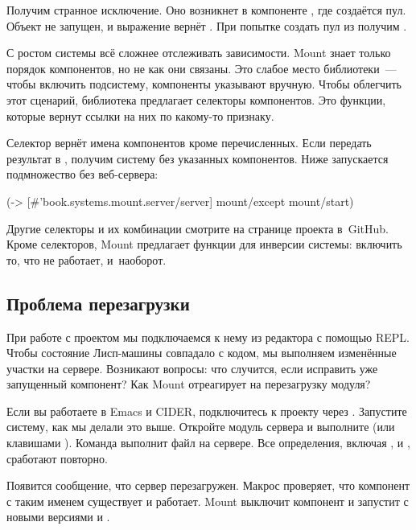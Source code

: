 Получим странное исключение. Оно возникнет в компоненте , где создаётся
пул. Объект  не запущен, и выражение  вернёт
. При попытке создать пул из  получим .

С ростом системы всё сложнее отслеживать зависимости. Mount знает только порядок
компонентов, но не как они связаны. Это слабое место библиотеки~--- чтобы
включить подсистему, компоненты указывают вручную. Чтобы облегчить этот
сценарий, библиотека предлагает селекторы компонентов. Это функции, которые
вернут ссылки на них по какому-то признаку.

Селектор  вернёт имена компонентов кроме перечисленных. Если
передать результат в , получим систему без указанных
компонентов. Ниже запускается подмножество без веб-сервера:

\begin{clojure}
(-> [#'book.systems.mount.server/server]
    mount/except
    mount/start)
\end{clojure}

Другие селекторы и их комбинации смотрите на странице проекта в~GitHub. Кроме
селекторов, Mount предлагает функции для инверсии системы: включить то, что не
работает, и~наоборот.

\subsection{Проблема перезагрузки}

При работе с проектом мы подключаемся к нему из редактора с помощью REPL. Чтобы
состояние Лисп-машины совпадало с кодом, мы выполняем изменённые участки на
сервере. Возникают вопросы: что случится, если исправить уже запущенный
компонент? Как Mount отреагирует на перезагрузку модуля?


Если вы работаете в Emacs и CIDER, подключитесь к проекту через
. Запустите систему, как мы делали это выше.
Откройте модуль сервера и выполните 
(или клавишами ). Команда выполнит файл на сервере.
Все определения, включая ,  и ,
сработают повторно.

Появится сообщение, что сервер перезагружен. Макрос  проверяет,
что компонент с таким именем существует и работает. Mount выключит компонент и
запустит с новыми версиями  и .

